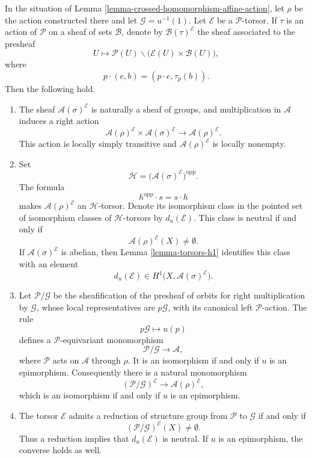 \begin{lemma}
\label{lemma-crossed-homomorphism-torsor-obstruction}
\begin{reference}
\cite[Chapter III, \S 3.4, p. 164]{Tohoku}
\end{reference}
In the situation of
Lemma \ref{lemma-crossed-homomorphism-affine-action},
let $\rho$ be the action constructed there and let
$\mathcal{G}=u^{-1}(1)$. Let $\mathcal{E}$ be a
$\mathcal{P}$-torsor. If $\tau$ is an action of $\mathcal{P}$ on a
sheaf of sets $\mathcal{B}$, denote by
$\mathcal{B}(\tau)^{\mathcal{E}}$ the sheaf associated to the
presheaf
$$
U \longmapsto
\mathcal{P}(U)\backslash
\bigl(\mathcal{E}(U)\times\mathcal{B}(U)\bigr),
$$
where
$$
p\cdot(e,b)=(p\cdot e,\tau_p(b)).
$$
Then the following hold.
\begin{enumerate}
\item The sheaf $\mathcal{A}(\sigma)^{\mathcal{E}}$ is naturally a
sheaf of groups, and multiplication in $\mathcal{A}$ induces a right
action
$$
\mathcal{A}(\rho)^{\mathcal{E}}\times
\mathcal{A}(\sigma)^{\mathcal{E}}
\longrightarrow
\mathcal{A}(\rho)^{\mathcal{E}}.
$$
This action is locally simply transitive and
$\mathcal{A}(\rho)^{\mathcal{E}}$ is locally nonempty.
\item Set
$$
\mathcal{H}=
\bigl(\mathcal{A}(\sigma)^{\mathcal{E}}\bigr)^{\mathrm{opp}}.
$$
The formula
$$
h^{\mathrm{opp}}\cdot s=s\cdot h
$$
makes $\mathcal{A}(\rho)^{\mathcal{E}}$ an
$\mathcal{H}$-torsor. Denote its isomorphism class in the pointed set
of isomorphism classes of $\mathcal{H}$-torsors by
$d_u(\mathcal{E})$. This class is neutral if and only if
$$
\mathcal{A}(\rho)^{\mathcal{E}}(X)\neq\emptyset.
$$
If $\mathcal{A}(\sigma)^{\mathcal{E}}$ is abelian, then
Lemma \ref{lemma-torsors-h1} identifies this class with an element
$$
d_u(\mathcal{E})\in
H^1\bigl(X,\mathcal{A}(\sigma)^{\mathcal{E}}\bigr).
$$
\item Let $\mathcal{P}/\mathcal{G}$ be the sheafification of the
presheaf of orbits for right multiplication by $\mathcal{G}$, whose
local representatives are $p\mathcal{G}$, with its canonical left
$\mathcal{P}$-action. The rule
$$
p\mathcal{G}\longmapsto u(p)
$$
defines a $\mathcal{P}$-equivariant monomorphism
$$
\mathcal{P}/\mathcal{G}\longrightarrow\mathcal{A},
$$
where $\mathcal{P}$ acts on $\mathcal{A}$ through $\rho$. It is an
isomorphism if and only if $u$ is an epimorphism. Consequently there
is a natural monomorphism
$$
(\mathcal{P}/\mathcal{G})^{\mathcal{E}}
\longrightarrow
\mathcal{A}(\rho)^{\mathcal{E}},
$$
which is an isomorphism if and only if $u$ is an epimorphism.
\item The torsor $\mathcal{E}$ admits a reduction of structure group
from $\mathcal{P}$ to $\mathcal{G}$ if and only if
$$
(\mathcal{P}/\mathcal{G})^{\mathcal{E}}(X)\neq\emptyset.
$$
Thus a reduction implies that $d_u(\mathcal{E})$ is neutral. If $u$
is an epimorphism, the converse holds as well.
\end{enumerate}
\end{lemma}


